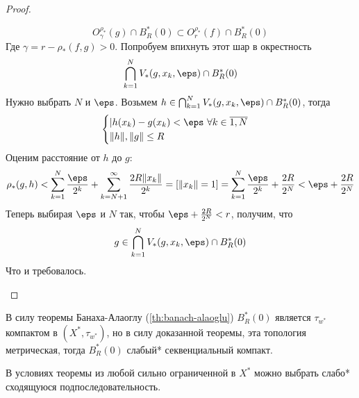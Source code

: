 \begin{proof}
\begin{enumerate}
		$$
		O_\gamma^{\rho_*}(g) \cap B_R^*(0) \subset O_r^{\rho_*}(f) \cap B_R^*(0)
		$$
		Где $\gamma = r - \rho_*(f,g) > 0$. Попробуем впихнуть этот шар в окрестность
		$$
		\bigcap_{k = 1}^N V_*(g, x_k, \eps) \cap B_R^*(0)
		$$
		Нужно выбрать $N$ и $\eps$. Возьмем $h \in \bigcap_{k = 1}^N V_*(g, x_k, \eps) \cap B_R^*(0)$, тогда 
		$$
		\begin{cases}
			|h(x_k) - g(x_k) < \eps  \ \forall k \in \overline{1,N}\\
			\|h\|, \|g\| \leq R
		\end{cases}
		$$
		Оценим расстояние от $h$ до $g$:
		$$
		\rho_*(g,h) < \sum_{k=1}^N\frac{\eps}{2^k} + \sum_{k = N+1}^\infty \frac{2R\|x_k\|}{2^k} = [\|x_k\| = 1] =  \sum_{k=1}^N\frac{\eps}{2^k} + \frac{2R}{2^N} < \eps + \frac{2R}{2^N}
		$$
		Теперь выбирая $\eps$ и $N$ так, чтобы $ \eps + \frac{2R}{2^N} < r$, получим, что 
		$$
		g \in \bigcap_{k = 1}^N V_*(g, x_k, \eps) \cap B_R^*(0)
		$$
		Что и требовалось.
	\end{enumerate}
\end{proof}
\begin{next0}
	В силу теоремы Банаха-Алаоглу (\ref{th:banach-alaoglu}) $B_R^*(0)$ является $\tau_{w^*}$ компактом в $(X^*, \tau_{w^*})$, но в силу доказанной теоремы, эта топология метрическая, тогда $B_R^*(0)$ слабый* секвенциальный компакт.
\end{next0}
\begin{next0}
	В условиях теоремы из любой сильно ограниченной в $X^*$ можно выбрать слабо* сходящуюся подпоследовательность. 
\end{next0}
